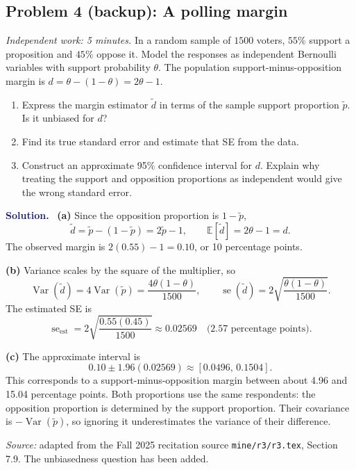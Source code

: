\documentclass[11pt]{article}
\newif\ifsolutions
\newcommand{\E}{\mathbb{E}}
\newcommand{\Var}{\operatorname{Var}}
\newcommand{\se}{\operatorname{se}}
\newcommand{\rv}[1]{\widetilde{#1}}
\newenvironment{answer}{%
    \par\medskip\noindent\textcolor{MidnightBlue}{\textbf{Solution.}}\ }
    {\par\medskip}
\newcommand{\workingspace}[1]{}
\newcommand{\workingspace}[1]{\vspace{#1}}
\begin{document}
\newpage
\subsection*{Problem 4 (backup): A polling margin}
\noindent\textit{Independent work: 5 minutes.}
In a random sample of $1500$ voters, $55\%$ support a proposition and
$45\%$ oppose it. Model the responses as independent Bernoulli variables
with support probability $\theta$. The population support-minus-opposition
margin is $d=\theta-(1-\theta)=2\theta-1$.
\begin{enumerate}
  \item Express the margin estimator $\rv{d}$ in terms of the sample
    support proportion $\rv{p}$. Is it unbiased for $d$?
  \item Find its true standard error and estimate that SE from the data.
  \item Construct an approximate 95\% confidence interval for $d$.
    Explain why treating the support and opposition proportions as
    independent would give the wrong standard error.
\end{enumerate}
\workingspace{11cm}

\begin{answer}
\textbf{(a)} Since the opposition proportion is $1-\rv{p}$,
\[
  \rv{d}=\rv{p}-(1-\rv{p})=2\rv{p}-1,\qquad
  \E[\rv{d}]=2\theta-1=d.
\]
The observed margin is $2(0.55)-1=0.10$, or 10 percentage points.

\textbf{(b)} Variance scales by the square of the multiplier, so
\[
  \Var(\rv{d})=4\Var(\rv{p})
    =\frac{4\theta(1-\theta)}{1500},\qquad
  \se(\rv{d})=2\sqrt{\frac{\theta(1-\theta)}{1500}}.
\]
The estimated SE is
\[
  \se_{\mathrm{est}}=2\sqrt{\frac{0.55(0.45)}{1500}}
    \approx0.02569\quad\text{(2.57 percentage points).}
\]

\textbf{(c)} The approximate interval is
\[
  0.10\pm1.96(0.02569)
    \approx\boxed{[0.0496,\,0.1504]}.
\]
This corresponds to a support-minus-opposition margin between about
4.96 and 15.04 percentage points. Both proportions use the same respondents:
the opposition proportion is determined by the support proportion.
Their covariance is $-\Var(\rv{p})$, so ignoring it underestimates
the variance of their difference.
\end{answer}

\vfill
\noindent\textit{Source:} adapted from the Fall 2025 recitation source
\texttt{mine/r3/r3.tex}, Section 7.9. The unbiasedness question has been added.

\ifsolutions
\newpage
\end{document}
